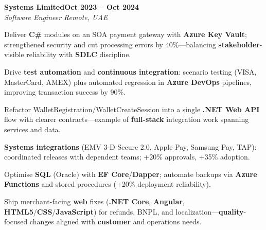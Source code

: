 \documentclass[letterpaper,10pt]{article}
\newcommand{\headingBf}[2]{
  \hspace{10pt}\textbf{#1}\hfill\textbf{#2}\\
}
\newcommand{\headingIt}[2]{
  \hspace{10pt}\textit{#1}\hfill\textit{#2}\\
}
\newenvironment{resume_list}{
  \vspace{-7pt}
  \begin{itemize}[itemsep=-2px, parsep=1pt, leftmargin=30pt]
}{
  \end{itemize}
}
\begin{document}
\headingBf{Systems Limited}{Oct 2023 -- Oct 2024}
\headingIt{Software Engineer \hfill Remote, UAE}{}
\begin{resume_list}
    \item Deliver \textbf{C\#} modules on an SOA payment gateway with \textbf{Azure Key Vault}; strengthened security and cut processing errors by 40\%---balancing \textbf{stakeholder}-visible reliability with \textbf{SDLC} discipline.
    \item Drive \textbf{test automation} and \textbf{continuous integration}: scenario testing (VISA, MasterCard, AMEX) plus automated regression in \textbf{Azure DevOps} pipelines, improving transaction success by 90\%.
    \item Refactor WalletRegistration/WalletCreateSession into a single \textbf{.NET Web API} flow with clearer contracts---example of \textbf{full-stack} integration work spanning services and data.
    \item \textbf{Systems integrations} (EMV\textregistered{} 3-D Secure 2.0, Apple Pay, Samsung Pay, TAP): coordinated releases with dependent teams; +20\% approvals, +35\% adoption.
    \item Optimise \textbf{SQL} (Oracle) with \textbf{EF Core}/\textbf{Dapper}; automate backups via \textbf{Azure Functions} and stored procedures (+20\% deployment reliability).
    \item Ship merchant-facing \textbf{web} fixes (\textbf{.NET Core}, \textbf{Angular}, \textbf{HTML5}/\textbf{CSS}/\textbf{JavaScript}) for refunds, BNPL, and localization---\textbf{quality}-focused changes aligned with \textbf{customer} and operations needs.
\end{resume_list}
\end{document}
